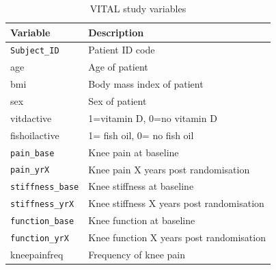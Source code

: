\documentclass{article}
\begin{document}
\begin{table}[H]
\centering
\caption{VITAL study variables}
\label{}

\begin{tabular}{ll}
\toprule
Variable & Description\\
\midrule
\texttt{Subject\_ID} & Patient ID code\\
age & Age of patient\\
bmi & Body mass index of patient\\
sex & Sex of patient\\
vitdactive & 1=vitamin D, 0=no vitamin D\\
\addlinespace
fishoilactive & 1= fish oil, 0= no fish oil\\
\texttt{pain\_base} & Knee pain at baseline\\
\texttt{pain\_yrX} & Knee pain X years post randomisation\\
\texttt{stiffness\_base} & Knee stiffness at baseline\\
\texttt{stiffness\_yrX} & Knee stiffness X years post randomisation\\
\addlinespace
\texttt{function\_base} & Knee function at baseline\\
\texttt{function\_yrX} & Knee function X years post randomisation\\
kneepainfreq & Frequency of knee pain\\
\bottomrule
\end{tabular}
\end{table}
\end{document}
